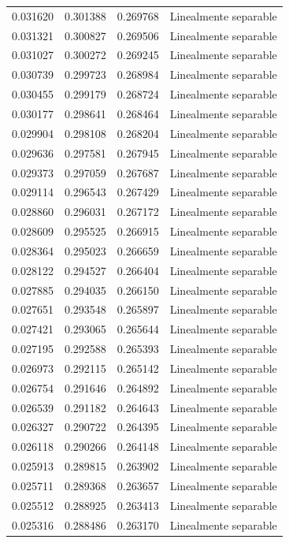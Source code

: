 \begin{tabular}{llll}
0.031620 & 0.301388 & 0.269768 & Linealmente separable \\
0.031321 & 0.300827 & 0.269506 & Linealmente separable \\
0.031027 & 0.300272 & 0.269245 & Linealmente separable \\
0.030739 & 0.299723 & 0.268984 & Linealmente separable \\
0.030455 & 0.299179 & 0.268724 & Linealmente separable \\
0.030177 & 0.298641 & 0.268464 & Linealmente separable \\
0.029904 & 0.298108 & 0.268204 & Linealmente separable \\
0.029636 & 0.297581 & 0.267945 & Linealmente separable \\
0.029373 & 0.297059 & 0.267687 & Linealmente separable \\
0.029114 & 0.296543 & 0.267429 & Linealmente separable \\
0.028860 & 0.296031 & 0.267172 & Linealmente separable \\
0.028609 & 0.295525 & 0.266915 & Linealmente separable \\
0.028364 & 0.295023 & 0.266659 & Linealmente separable \\
0.028122 & 0.294527 & 0.266404 & Linealmente separable \\
0.027885 & 0.294035 & 0.266150 & Linealmente separable \\
0.027651 & 0.293548 & 0.265897 & Linealmente separable \\
0.027421 & 0.293065 & 0.265644 & Linealmente separable \\
0.027195 & 0.292588 & 0.265393 & Linealmente separable \\
0.026973 & 0.292115 & 0.265142 & Linealmente separable \\
0.026754 & 0.291646 & 0.264892 & Linealmente separable \\
0.026539 & 0.291182 & 0.264643 & Linealmente separable \\
0.026327 & 0.290722 & 0.264395 & Linealmente separable \\
0.026118 & 0.290266 & 0.264148 & Linealmente separable \\
0.025913 & 0.289815 & 0.263902 & Linealmente separable \\
0.025711 & 0.289368 & 0.263657 & Linealmente separable \\
0.025512 & 0.288925 & 0.263413 & Linealmente separable \\
0.025316 & 0.288486 & 0.263170 & Linealmente separable \\

\end{tabular}
